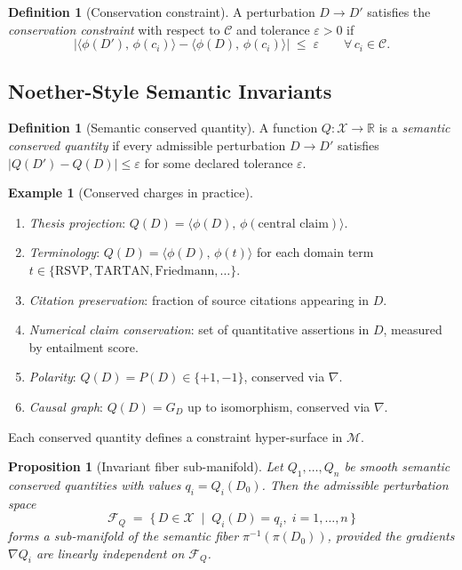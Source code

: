 \documentclass[12pt, a4paper]{article}
\theoremstyle{plain}
\newtheorem{proposition}[theorem]{Proposition}
\theoremstyle{definition}
\newtheorem{definition}[theorem]{Definition}
\newtheorem{example}[theorem]{Example}
\theoremstyle{remark}
\newcommand{\calX}{\mathcal{X}}
\newcommand{\calM}{\mathcal{M}}
\newcommand{\calF}{\mathcal{F}}
\newcommand{\bR}{\mathbb{R}}
\newcommand{\vpi}{\pi}
\newcommand{\ve}{\varepsilon}
\newcommand{\inner}[2]{\langle #1,\, #2 \rangle}
\newcommand{\fiber}[1]{\vpi^{-1}(#1)}
\newcommand{\connD}{\nabla}
\begin{document}
\begin{definition}[Conservation constraint]
\label{def:conservation}
A perturbation $D \to D'$ satisfies the \emph{conservation constraint} with
respect to $\mathcal{C}$ and tolerance $\ve > 0$ if
\[
   \bigl|\inner{\phi(D')}{\phi(c_i)} - \inner{\phi(D)}{\phi(c_i)}\bigr|
   \;\le\; \ve
   \qquad \forall\, c_i \in \mathcal{C}.
\]
\end{definition}

\subsection{Noether-Style Semantic Invariants}

\begin{definition}[Semantic conserved quantity]
\label{def:noether}
A function $Q : \calX \to \bR$ is a \emph{semantic conserved quantity} if
every admissible perturbation $D \to D'$ satisfies
$|Q(D') - Q(D)| \le \ve$ for some declared tolerance $\ve$.
\end{definition}

\begin{example}[Conserved charges in practice]
\begin{enumerate}[label=(\roman*)]
  \item \emph{Thesis projection}: $Q(D) = \inner{\phi(D)}{\phi(\text{central claim})}$.
  \item \emph{Terminology}: $Q(D) = \inner{\phi(D)}{\phi(t)}$ for each
        domain term $t \in \{\text{RSVP}, \text{TARTAN}, \text{Friedmann}, \ldots\}$.
  \item \emph{Citation preservation}: fraction of source citations appearing in $D$.
  \item \emph{Numerical claim conservation}: set of quantitative assertions
        in $D$, measured by entailment score.
  \item \emph{Polarity}: $Q(D) = P(D) \in \{+1, -1\}$, conserved via $\connD$.
  \item \emph{Causal graph}: $Q(D) = G_D$ up to isomorphism, conserved via $\connD$.
\end{enumerate}
\end{example}

Each conserved quantity defines a constraint hyper-surface in $\calM$.

\begin{proposition}[Invariant fiber sub-manifold]
\label{prop:invariant}
Let $Q_1, \ldots, Q_n$ be smooth semantic conserved quantities with values
$q_i = Q_i(D_0)$.  Then the admissible perturbation space
\[
   \calF_Q \;=\; \bigl\{\, D \in \calX \;\mid\; Q_i(D) = q_i,\;
   i = 1, \ldots, n \,\bigr\}
\]
forms a sub-manifold of the semantic fiber $\fiber{\vpi(D_0)}$, provided the
gradients $\nabla Q_i$ are linearly independent on $\calF_Q$.
\end{proposition}
\end{document}
